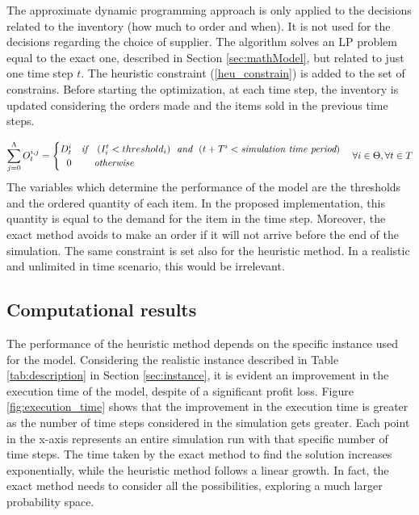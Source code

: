 \documentclass{article}
\begin{document}
The approximate dynamic programming approach is only applied to the decisions related to the inventory (how much to order and when). It is not used for the decisions regarding the choice of supplier.
The algorithm solves an LP problem equal to the exact one, described in Section \ref{sec:mathModel}, but related to just one time step $t$. The heuristic constraint (\ref{heu_constrain}) is added to the set of constrains. Before starting the optimization, at each time step, the inventory is updated considering the orders made and the items sold in the previous time steps. 

\begin{equation}
   \sum_{j=0}^\Lambda O^{i,j}_t = \begin{cases} 
   D_{t}^i \ \ \ \textit{if} \ \ \ (I_i^{t} < threshold_i) \ \ \textit{and} \ \ (t+T^i < \textit{simulation time period}) \\
   \ \ 0 \ \ \ \ \ \ \ \textit{otherwise} \\
   \end{cases}
   \forall i \in \Theta,  \forall t  \in T\\
   \label{heu_constrain}
\end{equation}
\newline
The variables which determine the performance of the model are the thresholds and the ordered quantity of each item. In the proposed implementation, this quantity is equal to the demand for the item in the time step. Moreover, the exact method avoids to make an order if it will not arrive before the end of the simulation. The same constraint is set also for the heuristic method. In a realistic and unlimited in time scenario, this would be irrelevant. 

\subsection{Computational results}
The performance of the heuristic method depends on the specific instance used for the model. Considering the realistic instance described in Table \ref{tab:description} in Section \ref{sec:instance}, it is evident an improvement in the execution time of the model, despite of a significant profit loss. 
Figure \ref{fig:execution_time} shows that the improvement in the execution time is greater as the number of time steps considered in the simulation gets greater. Each point in the x-axis represents an entire simulation run with that specific number of time steps. The time taken by the exact method to find the solution increases exponentially, while the heuristic method follows a linear growth. In fact, the exact method needs to consider all the possibilities, exploring a much larger probability space. 
\end{document}
